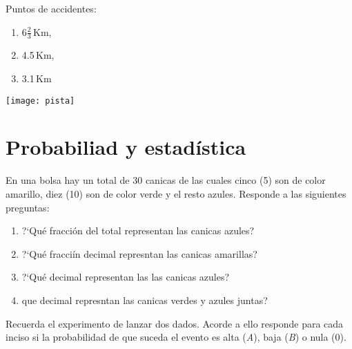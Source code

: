 \documentclass[11pt]{article}
\begin{document}
\begin{minipage}{0.5\linewidth}
Puntos de accidentes: \hspace{3mm} 

\begin{enumerate}[label=\alph*)] \itemsep-.3em
\item $6\frac{2}{3}$\,Km, \hspace{3mm}
\item 4.5\,Km, \hspace{3mm} 
\item 3.1\,Km
\end{enumerate}

\end{minipage}%
\begin{minipage}{0.5\linewidth}

    \begin{center}
        \texttt{[image: pista]}
    \end{center}
\end{minipage}


\section{Probabiliad y estad\'istica}

En una bolsa hay un total de 30 canicas de las cuales cinco (5) son de
color amarillo, diez (10) son de color verde y el resto azules. Responde a las
siguientes preguntas:

\begin{enumerate}[label=\alph*)] \itemsep-.3em
\item ?`Qu\'e fracci\'on del total representan las canicas azules?
\item ?`Qu\'e fracci\'in decimal represntan las canicas amarillas?
\item ?`Qu\'e decimal representan las las canicas azules?
\item que decimal represntan las canicas verdes y azules juntas?
\end{enumerate}

\vspace{5mm}

Recuerda el experimento de lanzar dos dados. Acorde a ello responde para cada
inciso si la probabilidad de que suceda el evento es alta (\emph{A}), baja
(\emph{B}) o nula (0).
\end{document}
